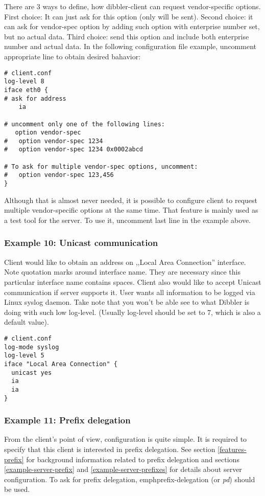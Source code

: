 There are 3 ways to define, how dibbler-client can request
vendor-specific options. First choice: It can just ask for this option (only 
 will be sent). Second choice: it can ask for
vendor-spec option by adding such option with enterprise number set, but
no actual data. Third choice: send this option and include both
enterprise number and actual data. In the following configuration file
example, uncomment appropriate line to obtain desired bahavior:

\begin{lstlisting}
# client.conf
log-level 8
iface eth0 {
# ask for address
    ia

# uncomment only one of the following lines:
   option vendor-spec
#   option vendor-spec 1234
#   option vendor-spec 1234 0x0002abcd

# To ask for multiple vendor-spec options, uncomment:
#   option vendor-spec 123,456
}
\end{lstlisting}

Although that is almost never needed, it is possible to configure
client to request multiple vendor-specific options at the same
time. That feature is mainly used as a test tool for the server. To
use it, uncomment last line in the example above.

\subsubsection{Example 10: Unicast communication}

Client would like to obtain an address on ,,Local Area Connection''
interface. Note quotation marks around
interface name. They are necessary since this particular interface name
contains spaces. Client also would like to accept Unicast
communication if server supports it. User wants all information 
to be logged via Linux syslog daemon. Take note that you won't be
able see to what Dibbler is doing with such low log-level. (Usually
log-level should be set to 7, which is also a default value).

\begin{lstlisting}
# client.conf
log-mode syslog
log-level 5
iface "Local Area Connection" {
  unicast yes
  ia
  ia
}
\end{lstlisting}

\subsubsection{Example 11: Prefix delegation}
\label{example-client-prefix}
From the client's point of view, configuration is quite simple. It is
required to specify that this client is interested in prefix
delegation. See section \ref{features-prefix} for background
information related to prefix delegation and sections
\ref{example-server-prefix} and \ref{example-server-prefixes} for
details about server configuration. To ask for prefix delegation, 
emph{prefix-delegation} (or \emph{pd}) should be used.

